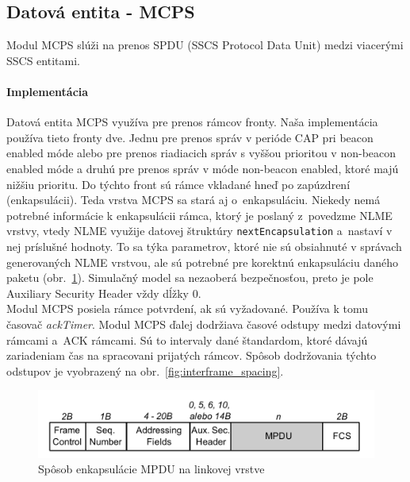 \subsection{Datová entita - MCPS}
\indent\indent Modul MCPS slúži na prenos SPDU (SSCS Protocol Data Unit) medzi viacerými SSCS entitami.\\
\paragraph{Implementácia}
Datová entita MCPS využíva pre prenos rámcov fronty. Naša implementácia používa tieto fronty dve. Jednu pre prenos správ v perióde CAP pri beacon enabled móde alebo pre prenos riadiacich správ s vyššou prioritou v non-beacon enabled móde a druhú pre prenos správ v móde non-beacon enabled, ktoré majú nižšiu prioritu. Do týchto front sú rámce vkladané hneď po zapúzdrení (enkapsulácii). Teda vrstva MCPS sa stará aj o~enkapsuláciu. Niekedy nemá potrebné informácie k enkapsulácii rámca, ktorý je poslaný z~povedzme NLME vrstvy, vtedy NLME využije datovej štruktúry \texttt{nextEncapsulation} a~nastaví v nej príslušné hodnoty. To sa týka parametrov, ktoré nie sú obsiahnuté v správach generovaných NLME vrstvou, ale sú potrebné pre korektnú enkapsuláciu daného paketu (obr.~\ref{fig:frame_mac}). Simulačný model sa nezaoberá bezpečnosťou, preto je pole Auxiliary Security Header vždy dĺžky $0$.\\
\indent Modul MCPS posiela rámce potvrdení, ak sú vyžadované. Používa k tomu časovač \textit{ackTimer}. Modul MCPS ďalej dodržiava časové odstupy medzi datovými rámcami a~ACK rámcami. Sú to intervaly dané štandardom, ktoré dávajú zariadeniam čas na spracovani prijatých rámcov. Spôsob dodržovania týchto odstupov je vyobrazený na obr.~\ref{fig:interframe_spacing}.\\
\begin{figure}[htbp]
\begin{center}
\includegraphics[width=140mm]{figures/frame_mac}
\caption{Spôsob enkapsulácie MPDU na linkovej vrstve}
\label{fig:frame_mac}
\end{center}
\end{figure}
